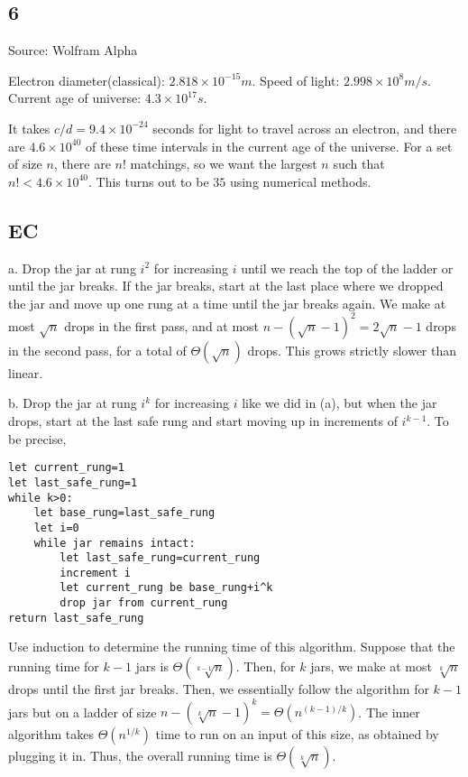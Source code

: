\documentclass{article}
\begin{document}
\subsection*{6}
Source: Wolfram Alpha

Electron diameter(classical): $2.818\times10^{-15}m$. Speed of light: $2.998\times10^8m/s$. Current age of universe: $4.3\times10^{17}s$. 

It takes $c/d=9.4\times10^{-24}$ seconds for light to travel across an electron, and there are $4.6\times10^{40}$ of these time intervals in the current age of the universe. For a set of size $n$, there are $n!$ matchings, so we want the largest $n$ such that $n!<4.6\times10^{40}$. This turns out to be $35$ using numerical methods.

\subsection*{EC}
a. Drop the jar at rung $i^2$ for increasing $i$ until we reach the top of the ladder or until the jar breaks. If the jar breaks, start at the last place where we dropped the jar and move up one rung at a time until the jar breaks again. We make at most $\sqrt{n}$ drops in the first pass, and at most $n-(\sqrt{n}-1)^2=2\sqrt{n}-1$ drops in the second pass, for a total of $\Theta(\sqrt{n})$ drops. This grows strictly slower than linear.

b. Drop the jar at rung $i^k$ for increasing $i$ like we did in (a), but when the jar drops, start at the last safe rung and start moving up in increments of $i^{k-1}$. To be precise,
\begin{verbatim}
let current_rung=1
let last_safe_rung=1
while k>0:
    let base_rung=last_safe_rung
    let i=0
    while jar remains intact:
        let last_safe_rung=current_rung
        increment i
        let current_rung be base_rung+i^k
        drop jar from current_rung
return last_safe_rung
\end{verbatim}

Use induction to determine the running time of this algorithm. Suppose that the running time for $k-1$ jars is $\Theta(\sqrt[k-1]{n})$. Then, for $k$ jars, we make at most $\sqrt[k]{n}$ drops until the first jar breaks. Then, we essentially follow the algorithm for $k-1$ jars but on a ladder of size $n-(\sqrt[k]{n}-1)^k=\Theta(n^{(k-1)/k})$. The inner algorithm takes $\Theta(n^{1/k})$ time to run on an input of this size, as obtained by plugging it in. Thus, the overall running time is $\Theta(\sqrt[k]{n})$.
\end{document}
